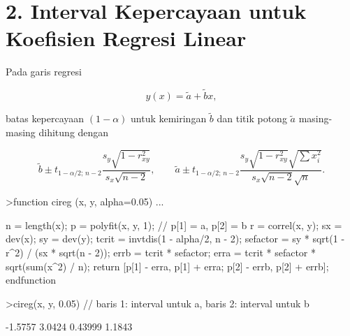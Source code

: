\documentclass[a4paper,11pt,oneside,enabledeprecatedfontcommands]{scrbook}
\newenvironment{eulernotebook}{}{}
\newcommand{\eulersubheading}[1]{\section{#1}}
\newenvironment{eulercomment}{\par\medskip\noindent}{\par\medskip}
\newenvironment{eulerformula}{}{}
\begin{document}
\begin{eulernotebook}
		\eulersubheading{2. Interval Kepercayaan untuk Koefisien Regresi Linear}
		\begin{eulercomment}
			Pada garis regresi
		\end{eulercomment}
		\begin{eulerformula}
			\[
			y(x) = \tilde{a} + \tilde{b}x,
			\]
		\end{eulerformula}
		\begin{eulercomment}
			batas kepercayaan $(1-\alpha)$ untuk kemiringan $\tilde{b}$ dan titik potong $\tilde{a}$ masing-masing
			dihitung dengan
		\end{eulercomment}
		\begin{eulerformula}
			\[
			\tilde{b} \pm t_{1-\alpha/2; \, n-2} \frac{s_y \sqrt{1 - r_{xy}^2}}{s_x \sqrt{n-2}}, \qquad \tilde{a} \pm t_{1-\alpha/2; \, n-2} \frac{s_y \sqrt{1 - r_{xy}^2} \sqrt{\sum x_i^2}}{s_x \sqrt{n-2} \sqrt{n}}.
			\]
		\end{eulerformula}
		\begin{eulerprompt}
			>function cireg (x, y, alpha=0.05) ...
		\end{eulerprompt}
		\begin{eulerudf}
			n = length(x);
			p = polyfit(x, y, 1); // p[1] = a, p[2] = b
			r = correl(x, y);
			sx = dev(x); sy = dev(y);
			tcrit = invtdis(1 - alpha/2, n - 2);
			sefactor = sy * sqrt(1 - r^2) / (sx * sqrt(n - 2));
			errb = tcrit * sefactor;
			erra = tcrit * sefactor * sqrt(sum(x^2) / n);
			return [p[1] - erra, p[1] + erra; p[2] - errb, p[2] + errb];
			endfunction
		\end{eulerudf}
		\begin{eulerprompt}
			>cireg(x, y, 0.05) // baris 1: interval untuk a, baris 2: interval untuk b
		\end{eulerprompt}
		\begin{euleroutput}
			  -1.5757    3.0424 
			  0.43999    1.1843 
		\end{euleroutput}
		

\end{eulernotebook}
\end{document}
